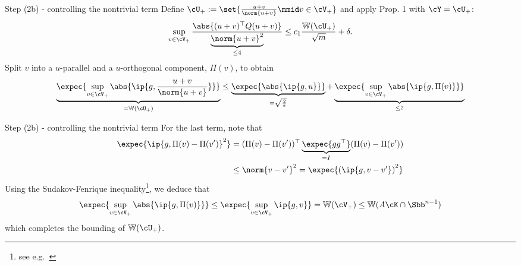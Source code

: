 \documentclass[10pt]{beamer}
\begin{document}
\begin{frame}{Step (2b) - controlling the nontrivial term}
    Define $\cU_+ := \set{\frac{u + v}{\norm{u + v}} \mmid v \in \cV_+}$ and
    apply Prop. 1 with $\cY = \cU_+$:
    \[
        \sup_{v \in \cV_+}
        \frac{\abs{(u + v)^\top Q (u + v)}}{
        \underbrace{\norm{u + v}^2}_{\leq 4}}
        \leq c_1 \frac{\mathbb{W}(\cU_+)}{\sqrt{m}} + \delta.
    \]
    Split $v$ into a $u$-parallel and a $u$-orthogonal component, $\Pi(v)$, to
    obtain
    \[
        \underbrace{\expec{\sup_{v \in \cV_+} \abs{\ip{g, \frac{u+v}{\norm{u +
        v}}}}}}_{= \mathbb{W}(\cU_+)}
        \leq \underbrace{\expec{\abs{\ip{g, u}}}}_{= \sqrt{\frac{2}{\pi}}} +
        \underbrace{\expec{\sup_{v \in \cV_+} \abs{\ip{g, \Pi(v)}}}}_{
        \leq ?}
    \]
\end{frame}

\begin{frame}{Step (2b) - controlling the nontrivial term}
    For the last term, note that
    \begin{align*}
        \expec{\ip{g, \Pi(v) - \Pi(v')}^2} &=
        (\Pi(v) - \Pi(v'))^\top \underbrace{\expec{g g^\top}}_{= I} (\Pi(v) -
        \Pi(v')) \\
        &\leq \norm{v - v'}^2 = \expec{\left( \ip{g, v - v'} \right)^2}
    \end{align*}
    Using the Sudakov-Fenrique inequality\footnote{see e.g.~\cite[Theorem
    7.2.11]{Versh18}}, we deduce that
    \[
        \expec{\sup_{v \in \cV_+} \abs{\ip{g, \Pi(v)}}}
        \leq \expec{\sup_{v \in \cV_+} \ip{g, v}} = \mathbb{W}(\cV_+)
        \leq \mathbb{W}(A \cK \cap \Sbb^{n - 1})
    \]
    which completes the bounding of $\mathbb{W}(\cU_+)$.
\end{frame}


\end{document}
